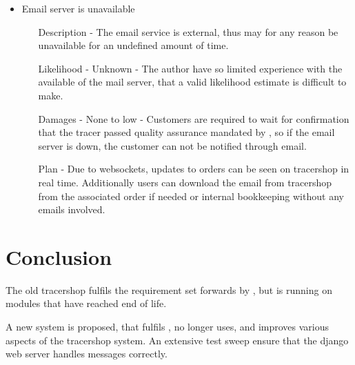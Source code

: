 \documentclass{article}
\begin{document}
\begin{itemize}
  \item Email server is unavailable
  \begin{itemize}
    \item[Description] - The email service is external, thus may for any reason be unavailable for an undefined amount of time.
    \item[Likelihood] - Unknown - The author have so limited experience with the available of the mail server, that a valid likelihood estimate is difficult to make.
    \item[Damages] - None to low - Customers are required to wait for confirmation that the tracer passed quality assurance mandated by , so if the email server is down, the customer can not be notified through email.
    \item[Plan] - Due to websockets, updates to orders can be seen on tracershop in real time. Additionally users can download the email from tracershop from the associated order if needed or internal bookkeeping without any emails involved.
  \end{itemize}
\end{itemize}


\section*{Conclusion}
The old tracershop fulfils the requirement set forwards by , but is running on modules that have reached end of life.

A new system is proposed, that fulfils , no longer uses, and improves various aspects of the tracershop system.
An extensive test sweep ensure that the django web server handles messages correctly.






\clearpage

\printglossaries
\end{document}
